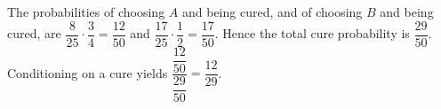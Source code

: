 The probabilities of choosing $A$ and being cured, and of choosing $B$ and being cured, are $\dfrac{8}{25}\cdot\dfrac{3}{4}=\dfrac{12}{50}$ and $\dfrac{17}{25}\cdot\dfrac{1}{2}=\dfrac{17}{50}$. Hence the total cure probability is $\dfrac{29}{50}$. Conditioning on a cure yields $\dfrac{\dfrac{12}{50}}{\dfrac{29}{50}}=\boxed{\dfrac{12}{29}}$.
